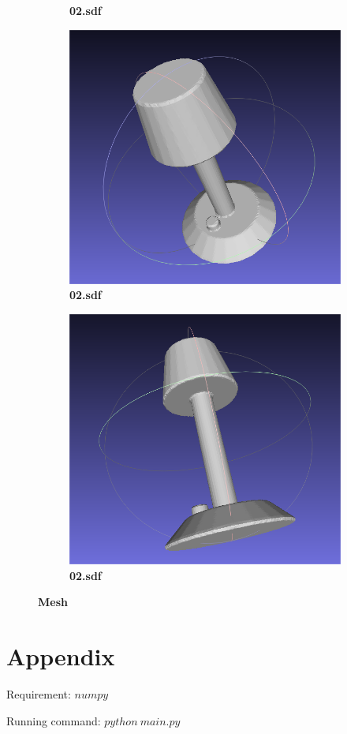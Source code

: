 \documentclass{ctexart}
\begin{document}
\begin{figure}[htbp]
\begin{subfigure}[htbp]{0.3\linewidth}
        \caption{\textbf{02.sdf}}
    \end{subfigure}
    \begin{subfigure}[htbp]{0.3\linewidth}
        \centering
        \includegraphics[width=0.9\linewidth]{figures/2_2.png}
        \caption{\textbf{02.sdf}}
    \end{subfigure}
    \begin{subfigure}[htbp]{0.3\linewidth}
        \centering
        \includegraphics[width=0.9\linewidth]{figures/2_3.png}
        \caption{\textbf{02.sdf}}
    \end{subfigure}
    \caption{\textbf{Mesh}}
\end{figure}

\appendix
\section{Appendix}
Requirement: $numpy$

Running command: $python\ main.py$
\end{document}
